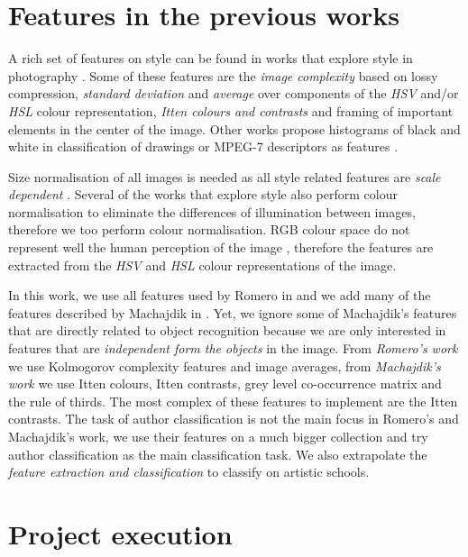 \documentclass[11pt,a4paper,twoside,openright]{report}
\begin{document}
\section{Features in the previous works}

A rich set of features on style can be found in works that explore style in
photography \cite{jma12clas,cmrc13fs,rmc12ajs,mach10clas}.  Some of these
features are the \emph{image complexity} based on lossy compression,
\emph{standard deviation} and \emph{average} over components of the \emph{HSV}
and/or \emph{HSL} colour representation, \emph{Itten colours and contrasts} and
framing of important elements in the center of the image.  Other works propose
histograms of black and white in classification of drawings \cite{kroner98draw}
or MPEG-7 descriptors as features \cite{isv12mpeg}.

Size normalisation of all images is needed as all style related features are
\emph{scale dependent} \cite{jma12clas,mach10clas}.  Several of the works that
explore style \cite{jma12clas,cmrc13fs,rmc12ajs} also perform colour
normalisation to eliminate the differences of illumination between images,
therefore we too perform colour normalisation.  RGB colour space do not
represent well the human perception of the image \cite{mach10clas}, therefore
the features are extracted from the \emph{HSV} and \emph{HSL} colour
representations of the image.

In this work, we use all features used by Romero in \cite{rmc12ajs} and we add
many of the features described by Machajdik in \cite{mach10clas}.  Yet, we
ignore some of Machajdik's features that are directly related to object
recognition because we are only interested in features that are
\emph{independent form the objects} in the image.  From \emph{Romero's work} we
use Kolmogorov complexity features and image averages, from \emph{Machajdik's
work} we use Itten colours, Itten contrasts, grey level co-occurrence matrix
and the rule of thirds.  The most complex of these features to implement are
the Itten contrasts.  The task of author classification is not the main focus
in Romero's and Machajdik's work, we use their features on a much bigger
collection and try author classification as the main classification task.  We
also extrapolate the \emph{feature extraction and classification} to classify
on artistic schools.

\section{Project execution}
\end{document}
